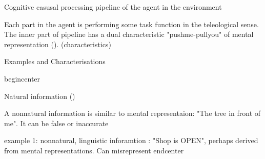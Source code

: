 \documentclass[10pt, aspectratio=169, handout]{beamer}
\begin{document}
\begin{frame}[label=fly_frog_pipeline]{ Cognitive casusal processing pipeline of the agent in the environment}
{
    }

    \begin{center}
    Each part in the agent is performing some task function in the teleological sense. The inner part of pipeline has a dual characteristic "pushme-pullyou" of mental representation (\cite{millikan_pushme-pullyou_2017}).
    (characteristics)
    \end{center}



\end{frame}



\begin{frame}[label=examples]{Examples and Characterisations}

  begin{center}

  

Natural information ()

A nonnatural information is similar to mental representaion: "The tree in front of me". It can be false or inaccurate


    example 1: nonnatural, linguistic inforamtion : "Shop is OPEN", perhaps derived from mental representations. Can misrepresent 
 end{center}



\end{frame}
\end{document}
